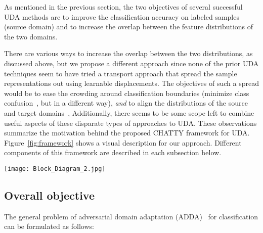 \documentclass[10pt,twocolumn,letterpaper]{article}
\begin{document}
As mentioned in the previous section, the two objectives of several successful UDA methods are to improve the classification accuracy on labeled samples (source domain) and to increase the overlap between the feature distributions of the two domains. 

There are various ways to increase the overlap between the two distributions, as discussed above, but we propose a different approach since none of the prior UDA techniques seem to have tried a transport approach that spread the sample representations out using learnable displacements. The objectives of such a spread would be to ease the crowding around classification boundaries (minimize class confusion~\cite{mcc}, but in a different way), \emph{and} to align the distributions of the source and target domains~\cite{mmd,homm,deepcoral,dcan,cdan,srdc}, Additionally, there seems to be some scope left to combine useful aspects of these disparate types of approaches to UDA. These observations summarize the motivation behind the proposed CHATTY framework for UDA. Figure~\ref{fig:framework} shows a visual description for our approach. Different components of this framework are described in each subsection below.


\begin{figure*}
\begin{center}
   \texttt{[image: Block\_Diagram\_2.jpg]}
\end{center}
   \caption{The proposed CHATTY framework, which is shared by the source and the target domain uses Transport Layers  and  compute the transport vectors that move classifier outputs to their final locations.}
\label{fig:framework}
\end{figure*}


\subsection{Overall objective}

The general problem of adversarial domain adaptation (ADDA)~\cite{adda} for classification can be formulated as follows:
\end{document}
